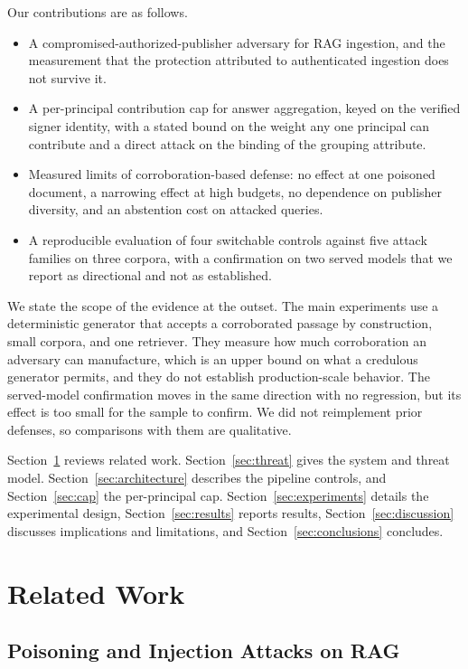 \documentclass[lettersize,journal]{IEEEtran}
\begin{document}
Our contributions are as follows.
\begin{itemize}
\item A compromised-authorized-publisher adversary for RAG ingestion, and the measurement that
      the protection attributed to authenticated ingestion does not survive it.
\item A per-principal contribution cap for answer aggregation, keyed on the verified signer
      identity, with a stated bound on the weight any one principal can contribute and a
      direct attack on the binding of the grouping attribute.
\item Measured limits of corroboration-based defense: no effect at one poisoned document, a
      narrowing effect at high budgets, no dependence on publisher diversity, and an abstention
      cost on attacked queries.
\item A reproducible evaluation of four switchable controls against five attack families on
      three corpora, with a confirmation on two served models that we report as
      directional and not as established.
\end{itemize}

We state the scope of the evidence at the outset. The main experiments use a deterministic
generator that accepts a corroborated passage by construction, small corpora, and one
retriever. They measure how much corroboration an adversary can manufacture, which is an upper
bound on what a credulous generator permits, and they do not establish production-scale
behavior. The served-model confirmation moves in the same direction with no regression, but
its effect is too small for the sample to confirm. We did not reimplement prior defenses, so
comparisons with them are qualitative.

Section~\ref{sec:related} reviews related work. Section~\ref{sec:threat} gives the system and
threat model. Section~\ref{sec:architecture} describes the pipeline controls, and
Section~\ref{sec:cap} the per-principal cap. Section~\ref{sec:experiments} details the
experimental design, Section~\ref{sec:results} reports results, Section~\ref{sec:discussion}
discusses implications and limitations, and Section~\ref{sec:conclusions} concludes.

\section{Related Work}
\label{sec:related}

\subsection{Poisoning and Injection Attacks on RAG}
\end{document}
